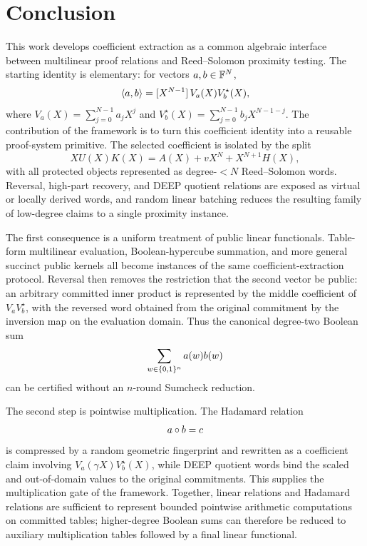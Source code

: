 \section{Conclusion}
\label{sec:conclusion}

This work develops coefficient extraction as a common algebraic interface between multilinear proof relations and Reed--Solomon proximity testing.  The starting identity is elementary: for vectors $a,b\in\mathbb{F}^N$,
\[
  \left\langle a,b\right\rangle
  =
  [X^{N-1}]\,V_a(X)V_b^\star(X),
\]
where $V_a(X)=\sum_{j=0}^{N-1}a_jX^j$ and $V_b^\star(X)=\sum_{j=0}^{N-1}b_jX^{N-1-j}$.  The contribution of the framework is to turn this coefficient identity into a reusable proof-system primitive.  The selected coefficient is isolated by the split
\begin{equation}
  XU(X)K(X)
  =
  A(X)+vX^N+X^{N+1}H(X),
  \label{eq:conclusion-master-identity}
\end{equation}
with all protected objects represented as degree-$<N$ Reed--Solomon words.  Reversal, high-part recovery, and DEEP quotient relations are exposed as virtual or locally derived words, and random linear batching reduces the resulting family of low-degree claims to a single proximity instance.

The first consequence is a uniform treatment of public linear functionals.  Table-form multilinear evaluation, Boolean-hypercube summation, and more general succinct public kernels all become instances of the same coefficient-extraction protocol.  Reversal then removes the restriction that the second vector be public: an arbitrary committed inner product is represented by the middle coefficient of $V_aV_b^\star$, with the reversed word obtained from the original commitment by the inversion map on the evaluation domain.  Thus the canonical degree-two Boolean sum
\[
  \sum_{w\in\{0,1\}^n} a(w)b(w)
\]
can be certified without an $n$-round Sumcheck reduction.

The second step is pointwise multiplication.  The Hadamard relation
\[
  a\circ b=c
\]
is compressed by a random geometric fingerprint and rewritten as a coefficient claim involving $V_a(\gamma X)V_b^\star(X)$, while DEEP quotient words bind the scaled and out-of-domain values to the original commitments.  This supplies the multiplication gate of the framework.  Together, linear relations and Hadamard relations are sufficient to represent bounded pointwise arithmetic computations on committed tables; higher-degree Boolean sums can therefore be reduced to auxiliary multiplication tables followed by a final linear functional.

